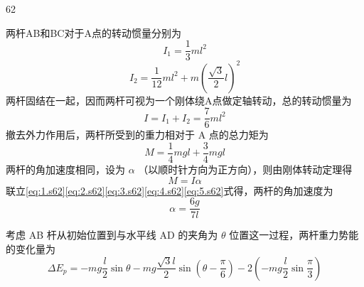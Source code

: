\begin{solution}{62}
    \begin{subsolution}
        \begin{subsubsolution}
            两杆AB和BC对于A点的转动惯量分别为
            \begin{equation}
                I _ {1} = \frac {1}{3} m l^{2}
                \label{eq:1.s62}
            \end{equation}
            \begin{equation}
                I _ {2} = \frac {1}{12} m l^{2} + m\left(\frac {\sqrt {3}}{2} l\right)^{2}
                \label{eq:2.s62}
            \end{equation}
            两杆固结在一起，因而两杆可视为一个刚体绕A点做定轴转动，总的转动惯量为
            \begin{equation}
                I = I _ {1} + I _ {2} = \frac {7}{6} m l^{2}
                \label{eq:3.s62}
            \end{equation}
            撤去外力作用后，两杆所受到的重力相对于 A 点的总力矩为
            \begin{equation}
                M = \frac {1}{4} m g l + \frac {3}{4} m g l
                \label{eq:4.s62}
            \end{equation}
            两杆的角加速度相同，设为 $\alpha$ （以顺时针方向为正方向），则由刚体转动定理得
            \begin{equation}
                M = I \alpha
                \label{eq:5.s62}
            \end{equation}
            联立\eqref{eq:1.s62}\eqref{eq:2.s62}\eqref{eq:3.s62}\eqref{eq:4.s62}\eqref{eq:5.s62}式得，两杆的角加速度为
            \begin{equation}
                \alpha = \frac {6 g}{7 l}
                \label{eq:6.s62}
            \end{equation}
        \end{subsubsolution}
        \begin{subsubsolution}
            考虑 AB 杆从初始位置到与水平线 AD 的夹角为 $\theta$ 位置这一过程，两杆重力势能的变化量为
            \begin{equation}
                \Delta E _ {p} = - m g \frac {l}{2} \sin \theta - m g \frac {\sqrt {3} l}{2} \sin\left(\theta - \frac {\pi}{6}\right) - 2\left(- m g \frac {l}{2} \sin \frac {\pi}{3}\right)
                \label{eq:7.s62}
            \end{equation}
            \begin{equation}

\end{equation}
\end{subsubsolution}
\end{subsolution}
\end{solution}
